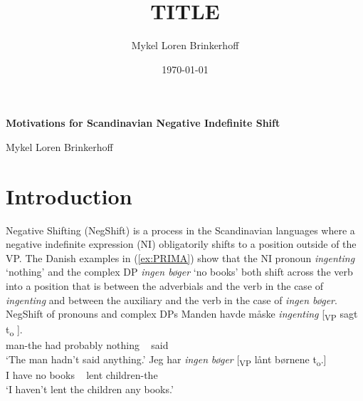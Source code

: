 \documentclass[12pt, letterpaper]{article}
\title{TITLE}
\author{Mykel Loren Brinkerhoff}
\date{\today}
\begin{document}
	
	
	\onehalfspacing
	
\begin{center}
	{\Large \textbf{Motivations for Scandinavian Negative Indefinite Shift}}
	\vspace{6pt}

	Mykel Loren Brinkerhoff
\end{center}
\thispagestyle{fancy}


\section{Introduction} \label{sec:INTRO}
Negative Shifting (NegShift) is a process in the Scandinavian languages where a negative indefinite expression (NI) obligatorily shifts to a position outside of the VP. The Danish examples in (\ref{ex:PRIMA}) show that the NI pronoun \textit{ingenting} `nothing' and the complex DP \textit{ingen bøger} `no books' both shift across the verb into a position that is between the adverbials and the verb in the case of \textit{ingenting} and between the auxiliary and the verb in the case of \textit{ingen bøger}.
	\ea NegShift of pronouns and complex DPs\label{ex:PRIMA}
		\ea
		\gll Manden havde måske \textit{ingenting} [\textsubscript{VP} sagt t\textsubscript{o} ].\\
		man-the had probably nothing ~ said\\
		\glt `The man hadn't said anything.'
		\ex 
		\gll Jeg har \textit{ingen} \textit{bøger} [\textsubscript{VP} lånt børnene t\textsubscript{o}.]\\
		I have no books ~ lent children-the\\
		\glt `I haven't lent the children any books.'
		\z
	\z 
\end{document}
